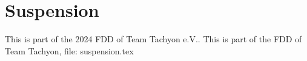 \section{Suspension}
This is part of the 2024 FDD of Team Tachyon e.V..
This is part of the FDD of Team Tachyon, file: suspension.tex
